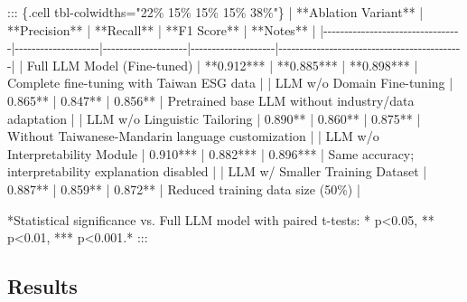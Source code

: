 \documentclass[
  12pt,
]{article}
\newenvironment{Shaded}{\begin{snugshade}}{\end{snugshade}}
\newcommand{\NormalTok}[1]{\textcolor[rgb]{0.00,0.23,0.31}{#1}}
\newcommand{\PreprocessorTok}[1]{\textcolor[rgb]{0.68,0.00,0.00}{#1}}
\begin{document}
\begin{Shaded}
\begin{Highlighting}[]
\NormalTok{::: \{.cell tbl{-}colwidths="22\% 15\% 15\% 15\% 38\%"\}}
\PreprocessorTok{|}\NormalTok{ **Ablation Variant**             | **Precision**      | **Recall**         | **F1 Score**       | **Notes**                                  }\PreprocessorTok{|}
\PreprocessorTok{|{-}{-}{-}{-}{-}{-}{-}{-}{-}{-}{-}{-}{-}{-}{-}{-}{-}{-}{-}{-}{-}{-}{-}{-}{-}{-}{-}{-}{-}{-}{-}{-}{-}|{-}{-}{-}{-}{-}{-}{-}{-}{-}{-}{-}{-}{-}{-}{-}{-}{-}{-}{-}{-}|{-}{-}{-}{-}{-}{-}{-}{-}{-}{-}{-}{-}{-}{-}{-}{-}{-}{-}{-}{-}|{-}{-}{-}{-}{-}{-}{-}{-}{-}{-}{-}{-}{-}{-}{-}{-}{-}{-}{-}{-}|{-}{-}{-}{-}{-}{-}{-}{-}{-}{-}{-}{-}{-}{-}{-}{-}{-}{-}{-}{-}{-}{-}{-}{-}{-}{-}{-}{-}{-}{-}{-}{-}{-}{-}{-}{-}{-}{-}{-}{-}{-}{-}{-}{-}|}
\PreprocessorTok{|}\NormalTok{ Full LLM Model (Fine{-}tuned)     }\PreprocessorTok{|}\NormalTok{ **0.912***         | **0.885***         | **0.898***         }\PreprocessorTok{|}\NormalTok{ Complete fine{-}tuning with Taiwan ESG data  }\PreprocessorTok{|}
\PreprocessorTok{|}\NormalTok{ LLM w/o Domain Fine{-}tuning       }\PreprocessorTok{|}\NormalTok{ 0.865**            }\PreprocessorTok{|}\NormalTok{ 0.847**            }\PreprocessorTok{|}\NormalTok{ 0.856**            }\PreprocessorTok{|}\NormalTok{ Pretrained base LLM without industry/data adaptation }\PreprocessorTok{|}
\PreprocessorTok{|}\NormalTok{ LLM w/o Linguistic Tailoring     }\PreprocessorTok{|}\NormalTok{ 0.890**            }\PreprocessorTok{|}\NormalTok{ 0.860**            }\PreprocessorTok{|}\NormalTok{ 0.875**            }\PreprocessorTok{|}\NormalTok{ Without Taiwanese{-}Mandarin language customization }\PreprocessorTok{|}
\PreprocessorTok{|}\NormalTok{ LLM w/o Interpretability Module  }\PreprocessorTok{|}\NormalTok{ 0.910***           }\PreprocessorTok{|}\NormalTok{ 0.882***           }\PreprocessorTok{|}\NormalTok{ 0.896***           }\PreprocessorTok{|}\NormalTok{ Same accuracy; interpretability explanation disabled }\PreprocessorTok{|}
\PreprocessorTok{|}\NormalTok{ LLM w/ Smaller Training Dataset  }\PreprocessorTok{|}\NormalTok{ 0.887**            }\PreprocessorTok{|}\NormalTok{ 0.859**            }\PreprocessorTok{|}\NormalTok{ 0.872**            }\PreprocessorTok{|}\NormalTok{ Reduced training data size (50\%)            }\PreprocessorTok{|}

\NormalTok{*Statistical significance vs. Full LLM model with paired t{-}tests: * p\textless{}0.05, ** p\textless{}0.01, *** p\textless{}0.001.*  }
\NormalTok{:::}
\end{Highlighting}
\end{Shaded}

\subsection{Results}\label{results-1}
\end{document}
